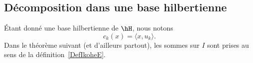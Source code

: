 \subsection{Décomposition dans une base hilbertienne}

Étant donné une base hilbertienne de \( \hH\), nous notons
\begin{equation}
    c_k(x)=\langle x, u_k\rangle .
\end{equation}
Dans le théorème suivant (et d'ailleurs partout), les sommes sur \( I\) sont prises au sens de la définition~\ref{DefIkoheE}.


